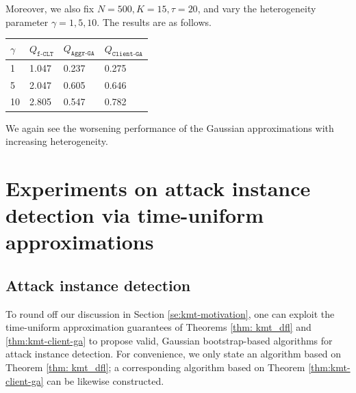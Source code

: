 \documentclass[a4paper,11pt]{article}
\numberwithin{equation}{section}
\theoremstyle{plain}
\theoremstyle{remark}
\begin{document}
Moreover, we also fix $N=500, K=15, \tau=20$, and vary the heterogeneity parameter $\gamma=1, 5, 10$. The results are as follows. 
\begin{table}[H]
\centering
\begin{tabular}{|l|l|l|l|}
\hline
$\gamma$ & $Q_{\texttt{f-CLT}}$ & $Q_{\texttt{Aggr-GA}}$ & $Q_{\texttt{Client-GA}}$ \\ \hline
1        & 1.047                & 0.237                  & 0.275                    \\ \hline
5        & 2.047                & 0.605                  & 0.646                    \\ \hline
10       & 2.805                & 0.547                  & 0.782                    \\ \hline
\end{tabular}
\end{table}
We again see the worsening performance of the Gaussian approximations with increasing heterogeneity.

\section{Experiments on attack instance detection via time-uniform approximations} \label{se:attack-algo}

\subsection{Attack instance detection} \label{se:attack-detection}
To round off our discussion in Section \ref{se:kmt-motivation}, one can exploit the time-uniform approximation guarantees of Theorems \ref{thm: kmt_dfl} and \ref{thm:kmt-client-ga} to propose valid, Gaussian bootstrap-based algorithms for attack instance detection. For convenience, we only state an algorithm based on Theorem \ref{thm: kmt_dfl}; a corresponding algorithm based on Theorem \ref{thm:kmt-client-ga} can be likewise constructed.
\end{document}
